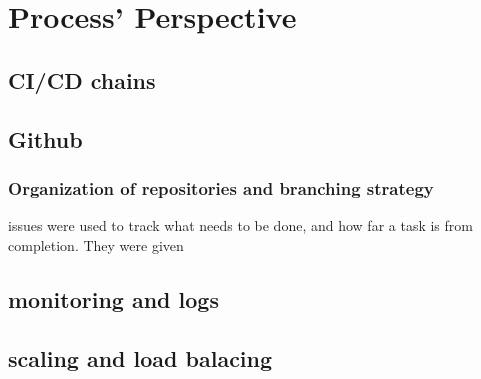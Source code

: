 \section{Process' Perspective}
\label{sec:process_perspective}



\subsection{CI/CD chains}


\subsection{Github}

\subsubsection{Organization of repositories and branching strategy}
issues were used to track what needs to be done, and how far a task is from completion. They were given 


\subsection{monitoring and logs}

\subsection{scaling and load balacing}

